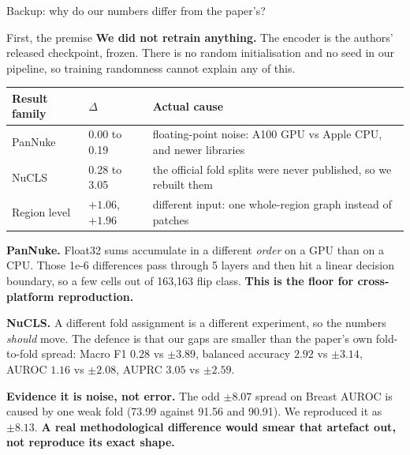 \documentclass[aspectratio=169,11pt]{beamer}
\newcommand{\hl}[1]{\textcolor{haem}{\textbf{#1}}}
\begin{document}
\begin{frame}[noframenumbering]{Backup: why do our numbers differ from the paper's?}

  \begin{alertblock}{First, the premise}
    \footnotesize \textbf{We did not retrain anything.} The encoder is the
    authors' released checkpoint, frozen. There is no random initialisation and
    no seed in our pipeline, so training randomness cannot explain any of this.
  \end{alertblock}

  \vspace{0.2em}
  \begin{center}\scriptsize
  \begin{tabular}{@{}lll@{}}
    \toprule
    \textbf{Result family} & \textbf{$\Delta$} & \textbf{Actual cause} \\
    \midrule
    PanNuke      & 0.00 to 0.19 & floating-point noise: A100 GPU vs Apple CPU, and newer libraries \\
    NuCLS        & 0.28 to 3.05 & the official fold splits were never published, so we rebuilt them \\
    Region level & $+1.06$, $+1.96$ & different input: one whole-region graph instead of patches \\
    \bottomrule
  \end{tabular}
  \end{center}

  \vspace{0.2em}
  {\scriptsize
  \hl{PanNuke.} Float32 sums accumulate in a different \emph{order} on a GPU than
  on a CPU. Those 1e-6 differences pass through 5 layers and then hit a linear
  decision boundary, so a few cells out of 163,163 flip class.
  \textbf{This is the floor for cross-platform reproduction.}

  \vspace{0.3em}
  \hl{NuCLS.} A different fold assignment is a different experiment, so the
  numbers \emph{should} move. The defence is that our gaps are smaller than the
  paper's own fold-to-fold spread: Macro F1 $0.28$ vs $\pm 3.89$, balanced
  accuracy $2.92$ vs $\pm 3.14$, AUROC $1.16$ vs $\pm 2.08$, AUPRC $3.05$ vs
  $\pm 2.59$.

  \vspace{0.3em}
  \hl{Evidence it is noise, not error.} The odd $\pm 8.07$ spread on Breast AUROC
  is caused by one weak fold (73.99 against 91.56 and 90.91). We reproduced it as
  $\pm 8.13$. \textbf{A real methodological difference would smear that artefact
  out, not reproduce its exact shape.}}

\end{frame}
\end{document}
